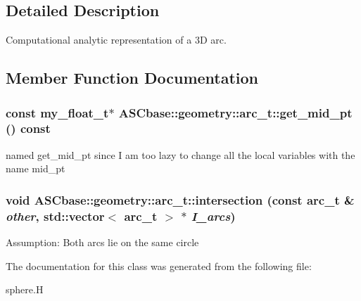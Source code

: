 \subsection{Detailed Description}
Computational analytic representation of a 3D arc. 



\subsection{Member Function Documentation}
\subsubsection{\setlength{\rightskip}{0pt plus 5cm}const my\_\-float\_\-t$\ast$ ASCbase::geometry::arc\_\-t::get\_\-mid\_\-pt () const\hspace{0.3cm}{\tt  [inline]}}\label{classASCbase_1_1geometry_1_1arc__t_86f92d310b8cc785ae09c45201f97258}


named get\_\-mid\_\-pt since I am too lazy to change all the local variables with the name mid\_\-pt 
\subsubsection{\setlength{\rightskip}{0pt plus 5cm}void ASCbase::geometry::arc\_\-t::intersection (const \bf{arc\_\-t} \& {\em other}, std::vector$<$ \bf{arc\_\-t} $>$ $\ast$ {\em I\_\-arcs})\hspace{0.3cm}{\tt  [inline]}}\label{classASCbase_1_1geometry_1_1arc__t_05ed53967368242ccad327e056f1d897}


Assumption: Both arcs lie on the same circle 

The documentation for this class was generated from the following file:\begin{CompactItemize}
\item 
sphere.H\end{CompactItemize}
